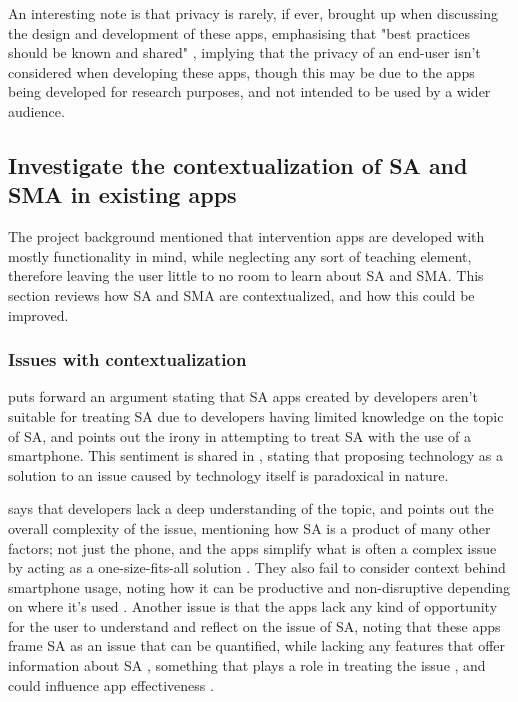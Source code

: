 \documentclass[12pt]{article}
\begin{document}
An interesting note is that privacy is rarely, if ever, brought 
up when discussing the design and development of these apps, emphasising that "best practices should be known and shared" 
\autocite{RefWorks:RefID:75-oliveira2021effectiveness}, implying that the privacy of an end-user isn't considered when 
developing these apps, though this may be due to the apps being developed for research purposes, and not intended to be 
used by a wider audience.\newline


\subsection{Investigate the contextualization of SA and SMA in existing apps}
The project background mentioned that intervention apps are developed with
mostly functionality in mind, while neglecting any sort of teaching element, therefore leaving the user little to 
no room to learn about SA and SMA. This section reviews how SA and SMA are contextualized, and
how this could be improved.

\subsubsection{Issues with contextualization}
\textcite{RefWorks:RefID:35-dosselaar2017smartphone} puts forward an argument stating that 
SA apps created by developers aren't suitable for treating SA due to developers having limited knowledge on the
topic of SA, and points out the irony in attempting to treat SA with the use of a smartphone. This sentiment is 
shared in \textcite{RefWorks:RefID:126-petrucco2021user}, stating that proposing technology as a solution to 
an issue caused by technology itself is paradoxical in nature. \newline

\textcite{RefWorks:RefID:35-dosselaar2017smartphone} says that developers lack a deep understanding of the topic, and points out the overall complexity of the issue, 
mentioning how SA is a product of many other factors; not just the phone, and the apps simplify what is often a complex 
issue by acting as a one-size-fits-all solution \autocite{RefWorks:RefID:35-dosselaar2017smartphone, RefWorks:RefID:132-monge2019race}. 
They also fail to consider context behind smartphone usage, noting how it can be productive 
\autocite{RefWorks:RefID:35-dosselaar2017smartphone} and non-disruptive depending on where it's used 
\autocite{RefWorks:RefID:126-petrucco2021user}. Another issue is that the apps lack any kind of opportunity
for the user to understand and reflect on the issue of SA, noting that these apps frame
SA as an issue that can be quantified, while lacking any features that offer information about SA 
\autocite{RefWorks:RefID:35-dosselaar2017smartphone}, something that plays a role in treating the issue 
\autocite{RefWorks:RefID:118-rosa2022problematic}, and could influence app effectiveness 
\autocite{RefWorks:RefID:125-rahmillah2023evaluating}.\newline
\end{document}
